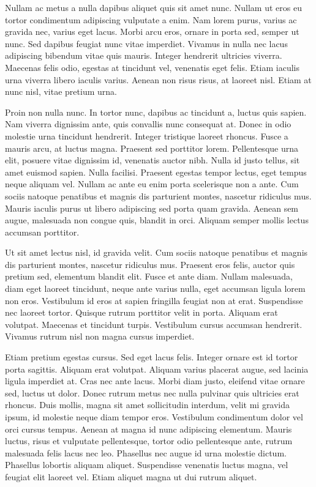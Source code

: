 Nullam ac metus a nulla dapibus aliquet quis sit amet nunc. Nullam ut eros eu tortor condimentum adipiscing vulputate a enim. Nam lorem purus, varius ac gravida nec, varius eget lacus. Morbi arcu eros, ornare in porta sed, semper ut nunc. Sed dapibus feugiat nunc vitae imperdiet. Vivamus in nulla nec lacus adipiscing bibendum vitae quis mauris. Integer hendrerit ultricies viverra. Maecenas felis odio, egestas at tincidunt vel, venenatis eget felis. Etiam iaculis urna viverra libero iaculis varius. Aenean non risus risus, at laoreet nisl. Etiam at nunc nisl, vitae pretium urna.

Proin non nulla nunc. In tortor nunc, dapibus ac tincidunt a, luctus quis sapien. Nam viverra dignissim ante, quis convallis nunc consequat at. Donec in odio molestie urna tincidunt hendrerit. Integer tristique laoreet rhoncus. Fusce a mauris arcu, at luctus magna. Praesent sed porttitor lorem. Pellentesque urna elit, posuere vitae dignissim id, venenatis auctor nibh. Nulla id justo tellus, sit amet euismod sapien. Nulla facilisi. Praesent egestas tempor lectus, eget tempus neque aliquam vel. Nullam ac ante eu enim porta scelerisque non a ante. Cum sociis natoque penatibus et magnis dis parturient montes, nascetur ridiculus mus. Mauris iaculis purus ut libero adipiscing sed porta quam gravida. Aenean sem augue, malesuada non congue quis, blandit in orci. Aliquam semper mollis lectus accumsan porttitor.

Ut sit amet lectus nisl, id gravida velit. Cum sociis natoque penatibus et magnis dis parturient montes, nascetur ridiculus mus. Praesent eros felis, auctor quis pretium sed, elementum blandit elit. Fusce et ante diam. Nullam malesuada, diam eget laoreet tincidunt, neque ante varius nulla, eget accumsan ligula lorem non eros. Vestibulum id eros at sapien fringilla feugiat non at erat. Suspendisse nec laoreet tortor. Quisque rutrum porttitor velit in porta. Aliquam erat volutpat. Maecenas et tincidunt turpis. Vestibulum cursus accumsan hendrerit. Vivamus rutrum nisl non magna cursus imperdiet.

Etiam pretium egestas cursus. Sed eget lacus felis. Integer ornare est id tortor porta sagittis. Aliquam erat volutpat. Aliquam varius placerat augue, sed lacinia ligula imperdiet at. Cras nec ante lacus. Morbi diam justo, eleifend vitae ornare sed, luctus ut dolor. Donec rutrum metus nec nulla pulvinar quis ultricies erat rhoncus. Duis mollis, magna sit amet sollicitudin interdum, velit mi gravida ipsum, id molestie neque diam tempor eros. Vestibulum condimentum dolor vel orci cursus tempus. Aenean at magna id nunc adipiscing elementum. Mauris luctus, risus et vulputate pellentesque, tortor odio pellentesque ante, rutrum malesuada felis lacus nec leo. Phasellus nec augue id urna molestie dictum. Phasellus lobortis aliquam aliquet. Suspendisse venenatis luctus magna, vel feugiat elit laoreet vel. Etiam aliquet magna ut dui rutrum aliquet.

